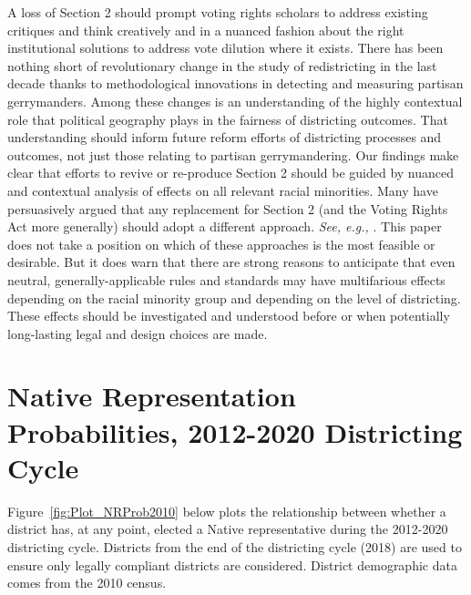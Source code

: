 \documentclass[12pt]{article}
\begin{document}
A loss of Section 2 should prompt voting rights scholars to address existing critiques and think creatively and in a nuanced fashion about the right institutional solutions to address vote dilution where it exists. There has been nothing short of revolutionary change in the study of redistricting in the last decade thanks to methodological innovations in detecting and measuring partisan gerrymanders.  Among these changes is an understanding of the highly contextual role that political geography plays in the fairness of districting outcomes.  That understanding should inform future reform efforts of districting processes and outcomes, not just those relating to partisan gerrymandering.  Our findings make clear that efforts to revive or re-produce Section 2 should be guided by nuanced and contextual analysis of effects on all relevant racial minorities.  Many have persuasively argued that any replacement for Section 2 (and the Voting Rights Act more generally) should adopt a different approach.  \textit{See, e.g., }\cite{charles2014voting,charles2017race,charles2018slouching,pildes2000diffusion}. This paper does not take a position on which of these approaches is the most feasible or desirable.  But it does warn that there are strong reasons to anticipate that even neutral, generally-applicable rules and standards may have multifarious effects depending on the racial minority group and depending on the level of districting.  These effects should be investigated and understood before or when potentially long-lasting legal and design choices are made.











\singlespacing
\clearpage
\newpage





\newpage
\appendix

\section{Native Representation Probabilities, 2012-2020 Districting Cycle}\label{app:elect_probability_2010}

Figure~\ref{fig:Plot_NRProb2010} below plots the relationship between whether a district has, at any point, elected a Native representative during the 2012-2020 districting cycle. Districts from the end of the districting cycle (2018) are used to ensure only legally compliant districts are considered. District demographic data comes from the 2010 census.
\end{document}
